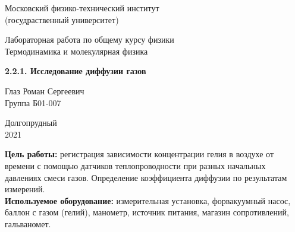 \documentclass[a4paper, 12pt]{article} %
\begin{document}


\begin{titlepage}

	\newpage
	\begin{center}
		\normalsize Московский физико-технический институт \\(госудраственный университет)
	\end{center}

	\vspace{6em}

	\begin{center}
		\Large Лабораторная работа по общему курсу физики\\Термодинамика и молекулярная физика
	\end{center}

	\vspace{1em}

	\begin{center}
		\Large \textbf{2.2.1. Исследование диффузии газов}
	\end{center}

	\vspace{2em}

	\begin{center}
		\large Глаз Роман Сергеевич\\
		Группа Б01-007
	\end{center}

	\vspace{\fill}

	\begin{center}
		Долгопрудный \\2021
	\end{center}
	
\end{titlepage}



	\thispagestyle{empty}
	\newpage
	\tableofcontents
	\newpage
	\setcounter{page}{1}



\textbf{Цель работы:} регистрация зависимости концентрации гелия в воздухе от времени с помощью датчиков теплопроводности при разных начальных давлениях смеси газов. Определение коэффициента диффузии по результатам измерений.\\

\textbf{Используемое оборудование:} измерительная установка, форвакуумный насос, баллон с газом (гелий), манометр, источник питания, магазин сопротивлений, гальваномет.
\end{document}
